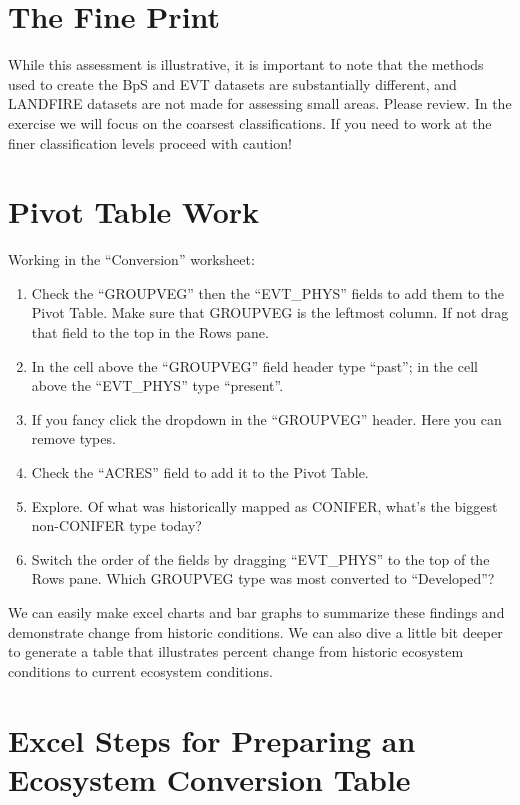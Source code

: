 \documentclass[
]{book}
\providecommand{\tightlist}{%
  \setlength{\itemsep}{0pt}\setlength{\parskip}{0pt}}
\begin{document}
\hypertarget{the-fine-print}{%
\section{The Fine Print}\label{the-fine-print}}

While this assessment is illustrative, it is important to note that the methods used to create the BpS and EVT datasets are substantially different, and LANDFIRE datasets are not made for assessing small areas. Please review. In the exercise we will focus on the coarsest classifications. If you need to work at the finer classification levels proceed with caution!

\hypertarget{pivot-table-work}{%
\section{Pivot Table Work}\label{pivot-table-work}}

Working in the ``Conversion'' worksheet:

\begin{enumerate}
\def\labelenumi{\arabic{enumi}.}
\tightlist
\item
  Check the ``GROUPVEG'' then the ``EVT\_PHYS'' fields to add them to the Pivot Table. Make sure that GROUPVEG is the leftmost column. If not drag that field to the top in the Rows pane.
\item
  In the cell above the ``GROUPVEG'' field header type ``past''; in the cell above the ``EVT\_PHYS'' type ``present''.
\item
  If you fancy click the dropdown in the ``GROUPVEG'' header. Here you can remove types.
\item
  Check the ``ACRES'' field to add it to the Pivot Table.
\item
  Explore. Of what was historically mapped as CONIFER, what's the biggest non-CONIFER type today?
\item
  Switch the order of the fields by dragging ``EVT\_PHYS'' to the top of the Rows pane. Which GROUPVEG type was most converted to ``Developed''?
\end{enumerate}

We can easily make excel charts and bar graphs to summarize these findings and demonstrate change from historic conditions. We can also dive a little bit deeper to generate a table that illustrates percent change from historic ecosystem conditions to current ecosystem conditions.

\hypertarget{excel-steps-for-preparing-an-ecosystem-conversion-table}{%
\section{Excel Steps for Preparing an Ecosystem Conversion Table}\label{excel-steps-for-preparing-an-ecosystem-conversion-table}}
\end{document}
